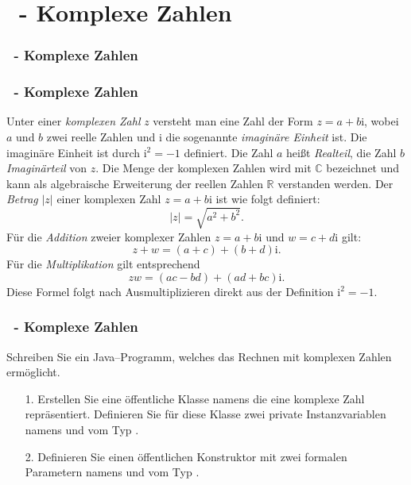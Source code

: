 \def\stitle{\theexercise\ - Komplexe Zahlen}
\section{\stitle}
\begin{frame}%
  \frametitle{\stitle}%
\tableofcontents[current]
\end{frame}
\begin{frame}%
  \frametitle{\stitle}%

Unter einer \emph{komplexen Zahl} $z$ versteht man eine Zahl der Form $z = a + b\mathrm{i}$, wobei $a$ und $b$ zwei reelle Zahlen und $\mathrm{i}$ die sogenannte \emph{imagin\"are Einheit} ist.
Die imagin\"are Einheit ist durch $\mathrm{i}^2 = -1$ definiert.
Die Zahl $a$ hei\ss t \emph{Realteil}, die Zahl $b$ \emph{Imagin\"arteil} von $z$.
Die Menge der komplexen Zahlen wird mit $\mathbb{C}$ bezeichnet und kann als algebraische Erweiterung der reellen Zahlen $\mathbb{R}$ verstanden werden.
Der \emph{Betrag} $\lvert z\rvert$ einer komplexen Zahl $z = a + b\mathrm{i}$ ist wie folgt definiert:
\begin{equation*}
\lvert z \rvert = \sqrt{a^2 + b^2}.
\end{equation*}
F\"ur die \emph{Addition} zweier komplexer Zahlen $z = a + b\mathrm{i}$ und $w = c + d\mathrm{i}$ gilt:
\begin{equation*}
z + w =(a+c) + (b+d)\mathrm{i}.
\end{equation*}
F\"ur die \emph{Multiplikation} gilt entsprechend
\begin{equation*}
z w =(ac - bd) + (ad + bc)\mathrm{i}.
\end{equation*}
Diese Formel folgt nach Ausmultiplizieren direkt aus der Definition $\mathrm{i}^2 = -1$.
\end{frame}


\begin{frame}%
  \frametitle{\stitle}%
Schreiben Sie ein Java--Programm, welches das Rechnen mit komplexen Zahlen erm\"oglicht.
\begin{enumerate}
\item[1.]
  Erstellen Sie eine \"offentliche Klasse namens  die eine komplexe Zahl repr\"asentiert.
  Definieren Sie f\"ur diese Klasse zwei private Instanzvariablen namens  und  vom Typ .
\item[2.]
  Definieren Sie einen \"offentlichen Konstruktor mit zwei formalen Parametern namens  und  vom Typ .
\end{enumerate}
\pause

\end{frame}


